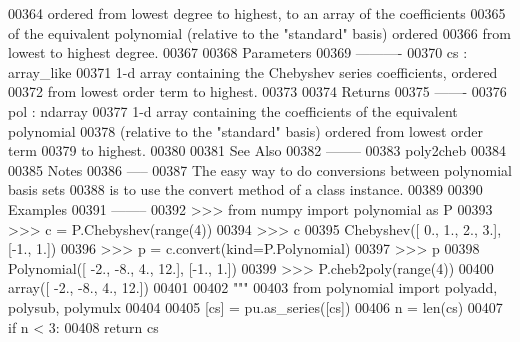 \begin{DoxyCode}
00364 \textcolor{stringliteral}{    ordered from lowest degree to highest, to an array of the coefficients}
00365 \textcolor{stringliteral}{    of the equivalent polynomial (relative to the "standard" basis) ordered}
00366 \textcolor{stringliteral}{    from lowest to highest degree.}
00367 \textcolor{stringliteral}{}
00368 \textcolor{stringliteral}{    Parameters}
00369 \textcolor{stringliteral}{    ----------}
00370 \textcolor{stringliteral}{    cs : array\_like}
00371 \textcolor{stringliteral}{        1-d array containing the Chebyshev series coefficients, ordered}
00372 \textcolor{stringliteral}{        from lowest order term to highest.}
00373 \textcolor{stringliteral}{}
00374 \textcolor{stringliteral}{    Returns}
00375 \textcolor{stringliteral}{    -------}
00376 \textcolor{stringliteral}{    pol : ndarray}
00377 \textcolor{stringliteral}{        1-d array containing the coefficients of the equivalent polynomial}
00378 \textcolor{stringliteral}{        (relative to the "standard" basis) ordered from lowest order term}
00379 \textcolor{stringliteral}{        to highest.}
00380 \textcolor{stringliteral}{}
00381 \textcolor{stringliteral}{    See Also}
00382 \textcolor{stringliteral}{    --------}
00383 \textcolor{stringliteral}{    poly2cheb}
00384 \textcolor{stringliteral}{}
00385 \textcolor{stringliteral}{    Notes}
00386 \textcolor{stringliteral}{    -----}
00387 \textcolor{stringliteral}{    The easy way to do conversions between polynomial basis sets}
00388 \textcolor{stringliteral}{    is to use the convert method of a class instance.}
00389 \textcolor{stringliteral}{}
00390 \textcolor{stringliteral}{    Examples}
00391 \textcolor{stringliteral}{    --------}
00392 \textcolor{stringliteral}{    >>> from numpy import polynomial as P}
00393 \textcolor{stringliteral}{    >>> c = P.Chebyshev(range(4))}
00394 \textcolor{stringliteral}{    >>> c}
00395 \textcolor{stringliteral}{    Chebyshev([ 0.,  1.,  2.,  3.], [-1.,  1.])}
00396 \textcolor{stringliteral}{    >>> p = c.convert(kind=P.Polynomial)}
00397 \textcolor{stringliteral}{    >>> p}
00398 \textcolor{stringliteral}{    Polynomial([ -2.,  -8.,   4.,  12.], [-1.,  1.])}
00399 \textcolor{stringliteral}{    >>> P.cheb2poly(range(4))}
00400 \textcolor{stringliteral}{    array([ -2.,  -8.,   4.,  12.])}
00401 \textcolor{stringliteral}{}
00402 \textcolor{stringliteral}{    """}
00403     \textcolor{keyword}{from} polynomial \textcolor{keyword}{import} polyadd, polysub, polymulx
00404 
00405     [cs] = pu.as\_series([cs])
00406     n = len(cs)
00407     \textcolor{keywordflow}{if} n < 3:
00408         \textcolor{keywordflow}{return} cs

\end{DoxyCode}
